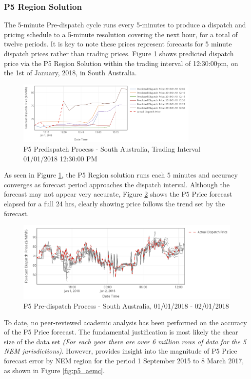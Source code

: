 \subsubsection{P5 Region Solution}
The 5-minute Pre-dispatch cycle runs every 5-minutes to produce a dispatch and pricing schedule to a 5-minute resolution covering the next hour, for a total of twelve periods. It is key to note these prices represent forecasts for 5 minute dispatch prices rather than trading prices. Figure \ref{fig:p5_process_1} shows predicted dispatch price via the P5 Region Solution within the trading interval of 12:30:00pm, on the 1st of January, 2018, in South Australia. 
\begin{figure}[!h]
\centering
\includegraphics[width=0.8\textwidth]{Pictures/Chapter2/P5_Process.png}
\caption{P5 Predispatch Process - South Australia, Trading Interval 01/01/2018 12:30:00 PM}
\label{fig:p5_process_1}
\end{figure}
As seen in Figure \ref{fig:p5_process_1}, the P5 Region solution runs each 5 minutes and accuracy converges as forecast period approaches the dispatch interval. Although the forecast may not appear very accurate, Figure \ref{fig:p5_process_2} shows the P5 Price forecast elapsed for a full 24 hrs, clearly showing price follows the trend set by the forecast. 
\begin{figure}[!h]
\centering
\includegraphics[width=1\textwidth]{Pictures/Chapter2/P5_Process_2.png}
\caption{P5 Pre-dispatch Process - South Australia, 01/01/2018 - 02/01/2018}
\label{fig:p5_process_2}
\end{figure}
To date, no peer-reviewed academic analysis has been performed on the accuracy of the P5 Price forecast. The fundamental justification is most likely the shear size of the data set \textit{(For each year there are over 6 million rows of data for the 5 NEM jurisdictions)}. However, \parencite{AEMCMarch2017} provides insight into the magnitude of P5 Price forecast error by NEM region for the period 1 September 2015 to 8 March 2017, as shown in Figure \ref{fig:p5_aemc}. 
